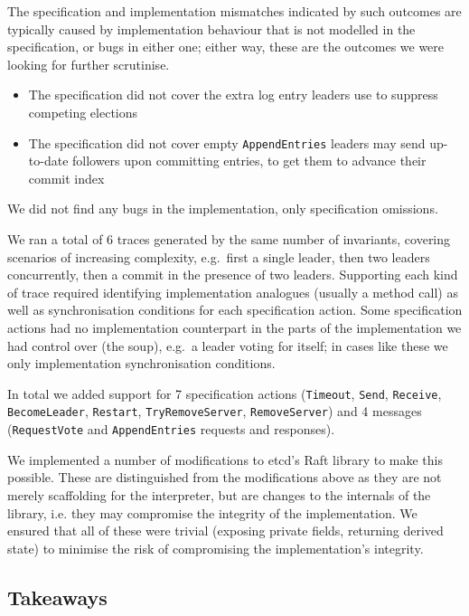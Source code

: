 \documentclass[a4paper]{article}
\begin{document}
The specification and implementation mismatches indicated by such outcomes are typically caused by implementation behaviour that is not modelled in the specification, or bugs in either one; either way, these are the outcomes we were looking for further scrutinise.

\begin{itemize}
\item The specification did not cover the extra log entry leaders use to suppress competing elections
\item The specification did not cover empty \texttt{AppendEntries} leaders may send up-to-date followers upon committing entries, to get them to advance their commit index
\end{itemize}

We did not find any bugs in the implementation, only specification omissions.

We ran a total of 6 traces generated by the same number of invariants, covering scenarios of increasing complexity, e.g.~first a single leader, then two leaders concurrently, then a commit in the presence of two leaders.
%
Supporting each kind of trace required identifying implementation analogues (usually a method call) as well as synchronisation conditions for each specification action.
%
Some specification actions had no implementation counterpart in the parts of the implementation we had control over (the soup), e.g.~a leader voting for itself; in cases like these we only implementation synchronisation conditions.

In total we added support for 7 specification actions (\texttt{Timeout}, \texttt{Send}, \texttt{Receive}, \texttt{BecomeLeader}, \texttt{Restart}, \texttt{TryRemoveServer}, \texttt{RemoveServer}) and 4 messages (\texttt{RequestVote} and \texttt{AppendEntries} requests and responses).

We implemented a number of modifications to etcd's Raft library to make this possible.
%
These are distinguished from the modifications above as they are not merely scaffolding for the interpreter, but are changes to the internals of the library, i.e.
%
they may compromise the integrity of the implementation.
%
We ensured that all of these were trivial (exposing private fields, returning derived state) to minimise the risk of compromising the implementation's integrity.

\subsection{Takeaways}
\end{document}
